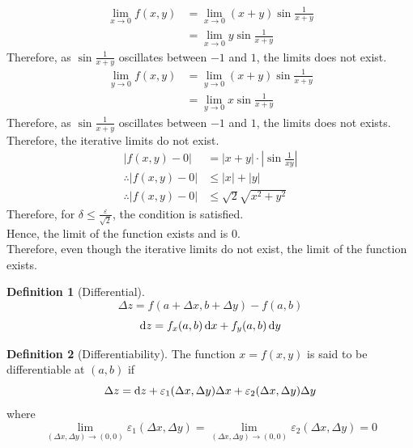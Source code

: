 \documentclass[fleqn, a4paper, 12pt, twoside]{article}
\theoremstyle{definition}
\newtheorem{definition}{Definition}
\theoremstyle{theorem}
\begin{document}
{\begin{solution}
	\begin{align*}
		\lim\limits_{x \to 0} f(x,y) & = \lim\limits_{x \to 0} (x + y) \sin \frac{1}{x + y} \\
                                             & = \lim\limits_{x \to 0} y \sin \frac{1}{x + y}
	\end{align*}
	Therefore, as $\sin \frac{1}{x + y}$ oscillates between $-1$ and $1$, the limits does not exist.
	\begin{align*}
		\lim\limits_{y \to 0} f(x,y) & = \lim\limits_{y \to 0} (x + y) \sin \frac{1}{x + y} \\
                                             & = \lim\limits_{y \to 0} x \sin \frac{1}{x + y}
	\end{align*}
	Therefore, as $\sin \frac{1}{x + y}$ oscillates between $-1$ and $1$, the limits does not exists.\\
	Therefore, the iterative limits do not exist.
	\begin{align*}
		|f(x,y) - 0|            & = |x + y| \cdot \left| \sin \frac{1}{x y} \right| \\
		\therefore |f(x,y) - 0| & \le |x| + |y|                                     \\
		\therefore |f(x,y) - 0| & \le \sqrt{2} \sqrt{x^2 + y^2}
	\end{align*}
	Therefore, for $\delta \le \frac{\varepsilon}{\sqrt{2}}$, the condition is satisfied.\\
	Hence, the limit of the function exists and is $0$.\\
	Therefore, even though the iterative limits do not exist, the limit of the function exists.
\end{solution}

\begin{definition}[Differential]
	\begin{equation*}
		\Delta z = f(a + \Delta x, b + \Delta y) - f(a, b)
	\end{equation*}
	\begin{equation*}
		\dif z = f_x(a,b) \dif x + f_y(a,b) \dif y
	\end{equation*}
\end{definition}

\begin{definition}[Differentiability]
	The function $x = f(x,y)$ is said to be differentiable at $(a,b)$ if
	\begin{equation*}
		\Delta z = \dif z + \varepsilon_1(\Delta x, \Delta y) \Delta x + \varepsilon_2(\Delta x, \Delta y) \Delta y
	\end{equation*}
	where
	\begin{equation*}
		\lim\limits_{(\Delta x, \Delta y) \to (0,0)} \varepsilon_1(\Delta x, \Delta y) = \lim\limits_{(\Delta x, \Delta y) \to (0,0)} \varepsilon_2(\Delta x, \Delta y) = 0
	\end{equation*}
\end{definition}

}
\end{document}
